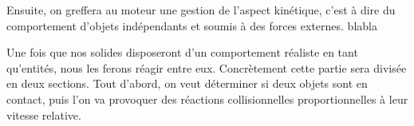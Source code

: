 Ensuite, on greffera au moteur une gestion de l'aspect kinétique, c'est à dire du comportement d'objets indépendants et soumis à des forces externes. blabla

Une fois que nos solides disposeront d'un comportement réaliste en tant qu'entités, nous les ferons réagir entre eux. Concrètement cette partie sera divisée en deux sections. Tout d'abord, on veut déterminer si deux objets sont en contact, puis l'on va provoquer des réactions collisionnelles proportionnelles à leur vitesse relative.
